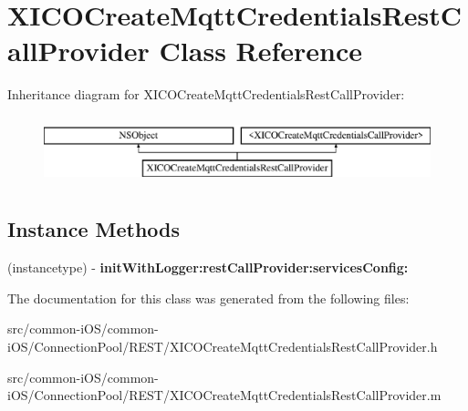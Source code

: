 \hypertarget{interface_x_i_c_o_create_mqtt_credentials_rest_call_provider}{}\section{X\+I\+C\+O\+Create\+Mqtt\+Credentials\+Rest\+Call\+Provider Class Reference}
\label{interface_x_i_c_o_create_mqtt_credentials_rest_call_provider}
Inheritance diagram for X\+I\+C\+O\+Create\+Mqtt\+Credentials\+Rest\+Call\+Provider\+:\begin{figure}[H]
\begin{center}
\leavevmode
\includegraphics[height=2.000000cm]{interface_x_i_c_o_create_mqtt_credentials_rest_call_provider}
\end{center}
\end{figure}
\subsection*{Instance Methods}
\begin{DoxyCompactItemize}
\item 
\hypertarget{interface_x_i_c_o_create_mqtt_credentials_rest_call_provider_a4d403657dca0256a3239058a0e6c8d6a}{}\label{interface_x_i_c_o_create_mqtt_credentials_rest_call_provider_a4d403657dca0256a3239058a0e6c8d6a} 
(instancetype) -\/ {\bfseries init\+With\+Logger\+:rest\+Call\+Provider\+:services\+Config\+:}
\end{DoxyCompactItemize}


The documentation for this class was generated from the following files\+:\begin{DoxyCompactItemize}
\item 
src/common-\/i\+O\+S/common-\/i\+O\+S/\+Connection\+Pool/\+R\+E\+S\+T/X\+I\+C\+O\+Create\+Mqtt\+Credentials\+Rest\+Call\+Provider.\+h\item 
src/common-\/i\+O\+S/common-\/i\+O\+S/\+Connection\+Pool/\+R\+E\+S\+T/X\+I\+C\+O\+Create\+Mqtt\+Credentials\+Rest\+Call\+Provider.\+m\end{DoxyCompactItemize}
